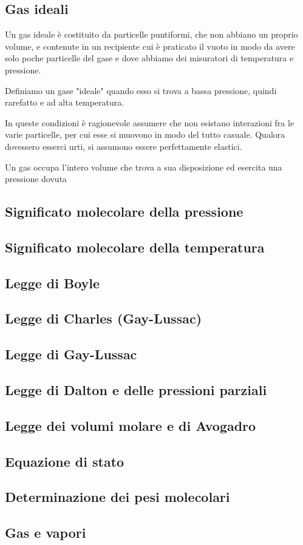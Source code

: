 \subsection{Gas ideali}
Un gas ideale è costituito da particelle puntiformi, che non abbiano un proprio volume, e contenute in un recipiente cui è praticato il vuoto in modo da avere solo poche particelle del gase e dove abbiamo dei misuratori di temperatura e pressione.

Definiamo un gase "ideale" quando esso si trova a bassa pressione, quindi rarefatto e ad alta temperatura.

In queste condizioni è ragionevole assumere che non esistano interazioni fra le varie particelle, per cui esse si muovono in modo del tutto casuale. Qualora dovessero esserci urti, si assumono essere perfettamente elastici.

Un gas occupa l'intero volume che trova a sua disposizione ed esercita una pressione dovuta
\subsection{Significato molecolare della pressione}
\subsection{Significato molecolare della temperatura}
\subsection{Legge di Boyle}
\subsection{Legge di Charles (Gay-Lussac)}
\subsection{Legge di Gay-Lussac}
\subsection{Legge di Dalton e delle pressioni parziali}
\subsection{Legge dei volumi molare e di Avogadro}
\subsection{Equazione di stato}
\subsection{Determinazione dei pesi molecolari}
\subsection{Gas e vapori}